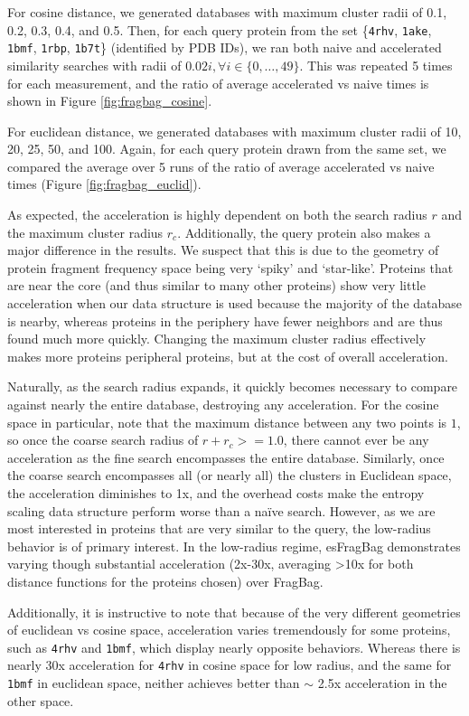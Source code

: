 \documentclass[review,preprint,12pt]{elsarticle}
\theoremstyle{definition}
\theoremstyle{remark}
\numberwithin{equation}{section}
\begin{document}
For cosine distance, we generated databases with maximum cluster radii of 0.1, 0.2, 0.3, 0.4, and 0.5.
Then, for each query protein from the set \{\texttt{4rhv}, \texttt{1ake}, \texttt{1bmf}, \texttt{1rbp}, \texttt{1b7t}\} (identified by PDB IDs), we ran both naive and accelerated similarity searches with radii of $0.02i, \forall i \in \{0,\ldots,49\}$.
This was repeated 5 times for each measurement, and the ratio of average accelerated vs naive times is shown in Figure \ref{fig:fragbag_cosine}.

For euclidean distance, we generated databases with maximum cluster radii of 10, 20, 25, 50, and 100.
Again, for each query protein drawn from the same set, we compared the average over 5 runs of the ratio of average accelerated vs naive times (Figure \ref{fig:fragbag_euclid}).

As expected, the acceleration is highly dependent on both the search radius $r$ and the maximum cluster radius $r_c$.
Additionally, the query protein also makes a major difference in the results.
We suspect that this is due to the geometry of protein fragment frequency space being very `spiky' and `star-like'.
Proteins that are near the core (and thus similar to many other proteins) show very little acceleration when our data structure is used because the majority of the database is nearby, whereas proteins in the periphery have fewer neighbors and are thus found much more quickly.
Changing the maximum cluster radius effectively makes more proteins peripheral proteins, but at the cost of overall acceleration.

Naturally, as the search radius expands, it quickly becomes necessary to compare against nearly the entire database, destroying any acceleration.
For the cosine space in particular, note that the maximum distance between any two points is $1$, so once the coarse search radius of $r+r_c >= 1.0$, there cannot ever be any acceleration as the fine search encompasses the entire database.
Similarly, once the coarse search encompasses all (or nearly all) the clusters in Euclidean space, the acceleration diminishes to 1x, and the overhead costs make the entropy scaling data structure perform worse than a na\"ive search.
However, as we are most interested in proteins that are very similar to the query, the low-radius behavior is of primary interest.
In the low-radius regime, esFragBag demonstrates varying though substantial acceleration (2x-30x, averaging >10x for both distance functions for the proteins chosen) over FragBag.

Additionally, it is instructive to note that because of the very different geometries of euclidean vs cosine space, acceleration varies tremendously for some proteins, such as \texttt{4rhv} and \texttt{1bmf}, which display nearly opposite behaviors.
Whereas there is nearly 30x acceleration for \texttt{4rhv} in cosine space for low radius, and the same for \texttt{1bmf} in euclidean space, neither achieves better than $\sim$ 2.5x acceleration in the other space.
\end{document}
